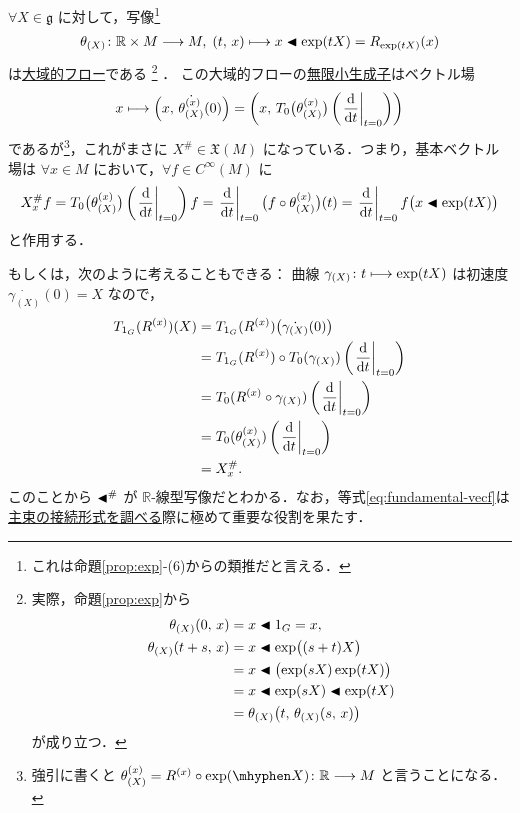 \documentclass[geometry_main]{subfiles}
\begin{document}
$\forall X \in \mathfrak{g}$ に対して，\cinfty 写像\footnote{これは命題\ref{prop:exp}-(6)からの類推だと言える．}
\begin{align}
    \theta_{(X)} \colon \mathbb{R} \times M \longrightarrow M,\; (t,\, x) \longmapsto x \blacktriangleleft \exp(tX) = R_{\exp(tX)} (x)
\end{align}
は\hyperref[def:flow-global]{大域的フロー}である
\footnote{
    実際，命題\ref{prop:exp}から
    \begin{align}
        \theta_{(X)}(0,\, x) &= x \blacktriangleleft 1_G = x, \\
        \theta_{(X)}(t+s,\, x) &= x \blacktriangleleft \exp \bigl( (s+t) X \bigr) \\
        &= x \blacktriangleleft \bigl(\exp(sX)\exp(tX)\bigr) \\
        &= x \blacktriangleleft \exp(sX) \blacktriangleleft \exp(tX) \\
        &= \theta_{(X)} \bigl(t ,\, \theta_{(X)}(s,\, x)\bigr)
    \end{align}
    が成り立つ．
}
．
この大域的フローの\hyperref[def:thm:fundamental-flow]{無限小生成子}はベクトル場
\begin{align}
    x \lmto \Bigl( x,\, \dot{\theta_{(X)}^{(x)}} (0) \Bigr) = \left( x,\, T_0 \bigl( \theta_{(X)}^{(x)} \bigr) \left( \eval{\dv{}{t}}_{t=0} \right)   \right) 
\end{align}
であるが\footnote{強引に書くと $\theta^{(x)}_{(X)} = R^{(x)} \circ \exp (\mhyphen X) \colon \mathbb{R} \lto M$ と言うことになる．}，これがまさに $X^\# \in \mathfrak{X}(M)$ になっている．つまり，基本ベクトル場は $\forall x \in M$ において，$\forall f \in C^\infty (M)$ に
\begin{align}
    X^\#_x f = T_0 \bigl( \theta_{(X)}^{(x)} \bigr) \left( \eval{\dv{}{t}}_{t=0} \right)f = \eval{\dv{}{t}}_{t=0} \bigl( f \circ \theta_{(X)}^{(x)}  \bigr) (t) = \eval{\dv{}{t}}_{t=0} f \bigl(x \btl \exp(tX)\bigr)
\end{align}
と作用する．

もしくは，次のように考えることもできる：
曲線 $\gamma_{(X)} \colon t  \longmapsto \exp(tX)$ は初速度 $\dot{\gamma_{(X)}}(0) = X$ なので，
\begin{align}
    T_{1_G}(R^{(x)}) (X) 
    &= T_{1_G} (R^{(x)}) \bigl( \dot{\gamma_{(X)}}(0) \bigr) \\
    &= T_{1_G} (R^{(x)}) \circ T_0 (\gamma_{(X)}) \left( \eval{\dv{}{t}}_{t=0} \right) \\
    &= T_0 (R^{(x)} \circ \gamma_{(X)}) \left( \eval{\dv{}{t}}_{t=0} \right) \\
    &= T_0 (\theta_{(X)}^{(x)})\left( \eval{\dv{}{t}}_{t=0} \right) \\
    &= X^\#_x. \label{eq:fundamental-vecf}
\end{align}
このことから $\blacktriangleleft^\#$ が $\mathbb{R}$-線型写像だとわかる．なお，等式\eqref{eq:fundamental-vecf}は\hyperref[thm:connection-basic]{主束の接続形式を調べる}際に極めて重要な役割を果たす．
\end{document}
